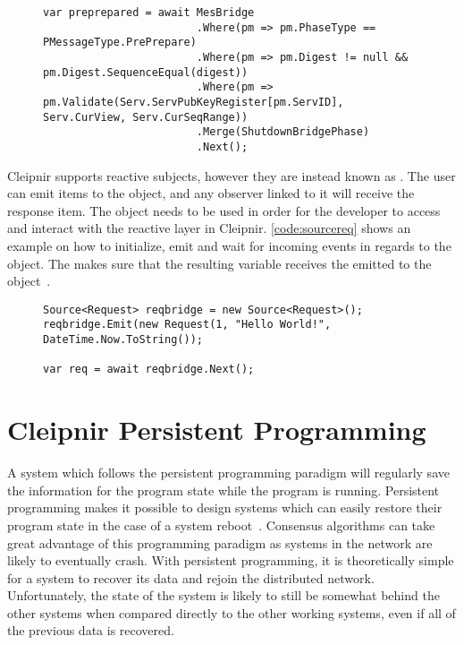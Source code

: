 \begin{figure}[H]
	\centering
	\begin{lstlisting}[label = code:operatorreq, caption=Chaining Cleipnir Operators, captionpos=b, basicstyle=\scriptsize]
var preprepared = await MesBridge
                        .Where(pm => pm.PhaseType == PMessageType.PrePrepare)
                        .Where(pm => pm.Digest != null && pm.Digest.SequenceEqual(digest))
                        .Where(pm => pm.Validate(Serv.ServPubKeyRegister[pm.ServID], Serv.CurView, Serv.CurSeqRange))
                        .Merge(ShutdownBridgePhase)
                        .Next();
\end{lstlisting}
\end{figure}
Cleipnir supports reactive subjects, however they are instead known as . The user can emit items to the  object, and any observer linked to it will receive the response item. The  object needs to be used in order for the developer to access and interact with the reactive layer in Cleipnir. \autoref{code:sourcereq} shows an example on how to initialize, emit and wait for incoming events in regards to the  object. The  makes sure that the resulting variable  receives the  emitted to the  object~\cite[p.~8]{PAPER:PaxosCleipnir}.

\begin{figure}[H]
	\centering
	\begin{lstlisting}[label = code:sourcereq, caption=Source object example, captionpos=b, basicstyle=\scriptsize]
Source<Request> reqbridge = new Source<Request>();
reqbridge.Emit(new Request(1, "Hello World!", DateTime.Now.ToString());

var req = await reqbridge.Next();
	\end{lstlisting}
\end{figure}

\section{Cleipnir Persistent Programming}
\label{section:PersistentProgramming}
A system which follows the persistent programming paradigm will regularly save the information for the program state while the program is running. Persistent programming makes it possible to design systems which can easily restore their program state in the case of a system reboot~\cites[p.~6]{PAPER:PaxosCleipnir}{DOC:Cleipnir}. Consensus algorithms can take great advantage of this programming paradigm as systems in the network are likely to eventually crash. With persistent programming, it is theoretically simple for a system to recover its data and rejoin the distributed network. Unfortunately, the state of the system is likely to still be somewhat behind the other systems when compared directly to the other working systems, even if all of the previous data is recovered. 

